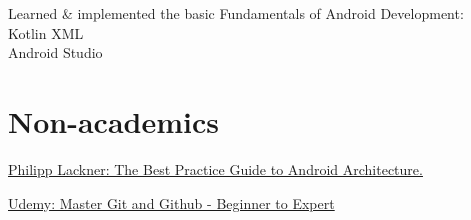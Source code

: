 \documentclass[]{deedy-resume-openfont}
\begin{document}
\begin{minipage}[t]{0.66\textwidth}
\begin{tightemize}
\item Learned \& implemented the basic Fundamentals of Android Development: \\
\quad \textbullet{} Kotlin \textbullet{} XML \\
\quad \textbullet{} Android Studio \\
\end{tightemize}
\sectionsep






\section{Non-academics}
\begin{tightemize} 
\item \href{https://pl-coding.com/best-practice-guide}{Philipp Lackner: The Best Practice Guide to Android Architecture.}
\item \href{https://www.udemy.com/certificate/UC-b3157d51-19c3-4510-a924-2206bc5a0903/}{Udemy: Master Git and Github - Beginner to Expert}
\end{tightemize}
\sectionsep



%
% 
% 

\end{minipage} 
\end{document}
